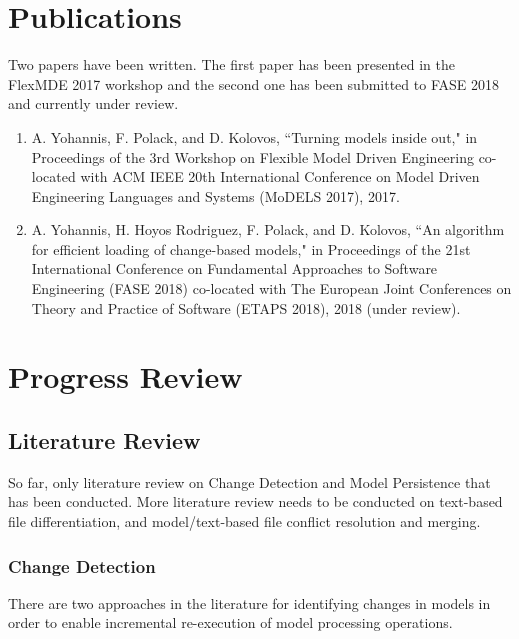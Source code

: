 \documentclass[12pt, a4paper]{report} \usepackage[titletoc]{appendix}
\begin{document}
\chapter{Publications}
\label{ch:publications}
Two papers have been written. The first paper \cite{yohannis2017turning} has been presented in the FlexMDE 2017 workshop and the second one \cite{yohannis2018algorithm} has been submitted to FASE 2018 and currently under review.
\begin{enumerate}
	\item A. Yohannis, F. Polack, and D. Kolovos, ``Turning models inside out," in Proceedings of the 3rd Workshop on Flexible Model Driven Engineering co-located with ACM IEEE 20th International Conference on Model Driven Engineering Languages and Systems (MoDELS 2017), 2017.
	\item  A. Yohannis, H. Hoyos Rodriguez, F. Polack, and D. Kolovos, ``An algorithm for efficient loading of change-based models," in Proceedings of the 21st International Conference on Fundamental Approaches to Software Engineering (FASE 2018) co-located with The European Joint Conferences on Theory and Practice of Software (ETAPS 2018), 2018 (under review).
\end{enumerate}

\chapter{Progress Review}
\label{ch:progress_review}

\section{Literature Review}
\label{sec:literature_review}
So far, only literature review on Change Detection and Model Persistence that has been conducted. More literature review needs to be conducted on text-based file differentiation, and model/text-based file conflict resolution  and merging.  


\subsection{Change Detection}
\label{subsec:change_detection}
There are two approaches in the literature for identifying changes in models in order to enable incremental re-execution of model processing operations.
\end{document}
